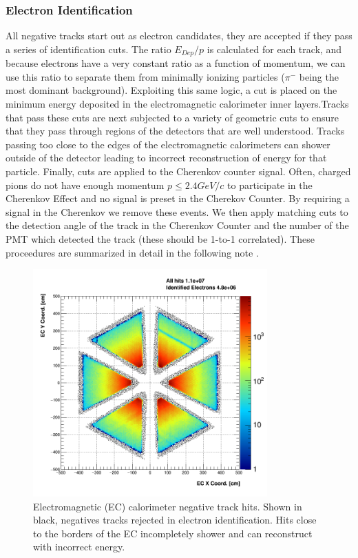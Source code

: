 \subsubsection{Electron Identification}
All negative tracks start out as electron candidates, they are accepted if they pass a series of identification cuts. The ratio $E_{Dep}/p$ is calculated for each track, and because electrons have a very constant ratio as a function of momentum, we can use this ratio to separate them from minimally ionizing particles ($\pi^{-}$ being the most dominant background).  Exploiting this same logic, a cut is placed on the minimum energy deposited in the electromagnetic calorimeter inner layers.Tracks that pass these cuts are next subjected to a variety of geometric cuts to ensure that they pass through regions of the detectors that are well understood.  Tracks passing too close to the edges of the electromagnetic calorimeters can shower outside of the detector leading to incorrect reconstruction of energy for that particle.  Finally, cuts are applied to the Cherenkov counter signal.  Often, charged pions do not have enough momentum $p \leq 2.4 GeV/c$ to participate in the Cherenkov Effect and no signal is preset in the Cherekov Counter.  By requiring a signal in the Cherenkov we remove these events.  We then apply matching cuts to the detection angle of the track in the Cherenkov Counter and the number of the PMT which detected the track (these should be 1-to-1 correlated).  These proceedures are summarized in detail in the following note \cite{electron-note}.

\begin{figure}
  \centering
  \includegraphics[width=9cm]{image/ECFiducial.png}
  \caption{Electromagnetic (EC) calorimeter negative track hits.  Shown in black, negatives tracks rejected in electron identification.  Hits close to the borders of the EC incompletely shower and can reconstruct with incorrect energy.}
  \label{fig:ecfid}
\end{figure}

